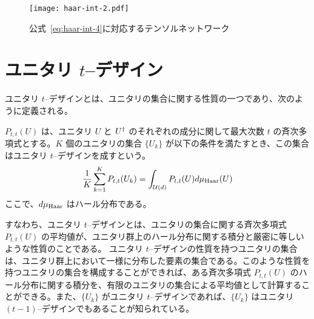 \begin{figure}[H]
    \centering
    \texttt{[image: haar-int-2.pdf]}
    \caption{公式~\eqref{eq:haar-int-4}に対応するテンソルネットワーク}
    \label{fig:haar-int-4}
\end{figure}






\section{ユニタリ $t$--デザイン}\label{sec:unitary-t-design}
ユニタリ $t$--デザインとは、ユニタリの集合に関する性質の一つであり、次のように定義される。
\begin{screen}
    \begin{definition}
        $P_{t,t}(U)$ は、ユニタリ $U$ と $U^\dagger$ のそれぞれの成分に関して最大次数 $t$ の斉次多項式とする。$K$ 個のユニタリの集合 $\{U_k\}$ が以下の条件を満たすとき、この集合はユニタリ $t$--デザインを成すという。
        \begin{align}
            \frac{1}{K} \sum_{k=1}^{K} P_{t,t}(U_k) = \int_{\mathcal{U}(d)} P_{t,t} (U) d\mu_{\mathrm{Haar}}(U)
        \end{align}
        ここで、$d\mu_{\mathrm{Haar}}$ はハール分布である。
    \end{definition}
\end{screen}
すなわち、ユニタリ $t$--デザインとは、ユニタリの集合に関する斉次多項式 $P_{t,t}(U)$ の平均値が、ユニタリ群上のハール分布に関する積分と厳密に等しいような性質のことである。
ユニタリ $t$--デザインの性質を持つユニタリの集合は、ユニタリ群上において一様に分布した要素の集合である。このような性質を持つユニタリの集合を構成することができれば、ある斉次多項式 $P_{t,t}(U)$ のハール分布に関する積分を、有限のユニタリの集合による平均値として計算することができる。また、$\{U_k\}$ がユニタリ $t$--デザインであれば、$\{U_k\}$ はユニタリ $(t-1)$--デザインでもあることが知られている。

